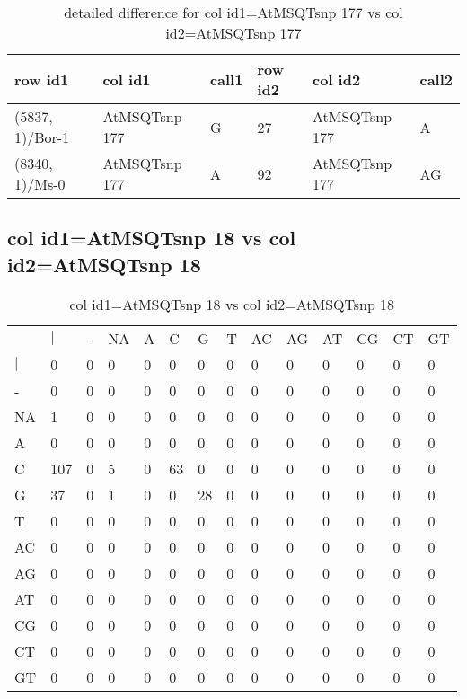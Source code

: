 \begin{center}
\begin{longtable}{|l|l|l|l|l|l|}
\caption{detailed difference for col id1=AtMSQTsnp 177 vs col id2=AtMSQTsnp 177} \label{table_dm549}\\
\hline
row id1&col id1&call1&row id2&col id2&call2\\
\hline
(5837, 1)/Bor-1&AtMSQTsnp 177&G&27&AtMSQTsnp 177&A\\
(8340, 1)/Ms-0&AtMSQTsnp 177&A&92&AtMSQTsnp 177&AG\\
\hline
\end{longtable}
\end{center}

\subsection{col id1=AtMSQTsnp 18 vs col id2=AtMSQTsnp 18}
\begin{center}
\begin{longtable}{|l|l|l|l|l|l|l|l|l|l|l|l|l|l|}
\caption{col id1=AtMSQTsnp 18 vs col id2=AtMSQTsnp 18} \label{table_dm550}\\
\hline
\\
\hline
&$|$&-&NA&A&C&G&T&AC&AG&AT&CG&CT&GT\\
$|$&0&0&0&0&0&0&0&0&0&0&0&0&0\\
-&0&0&0&0&0&0&0&0&0&0&0&0&0\\
NA&1&0&0&0&0&0&0&0&0&0&0&0&0\\
A&0&0&0&0&0&0&0&0&0&0&0&0&0\\
C&107&0&5&0&63&0&0&0&0&0&0&0&0\\
G&37&0&1&0&0&28&0&0&0&0&0&0&0\\
T&0&0&0&0&0&0&0&0&0&0&0&0&0\\
AC&0&0&0&0&0&0&0&0&0&0&0&0&0\\
AG&0&0&0&0&0&0&0&0&0&0&0&0&0\\
AT&0&0&0&0&0&0&0&0&0&0&0&0&0\\
CG&0&0&0&0&0&0&0&0&0&0&0&0&0\\
CT&0&0&0&0&0&0&0&0&0&0&0&0&0\\
GT&0&0&0&0&0&0&0&0&0&0&0&0&0\\
\hline
\end{longtable}
\end{center}

